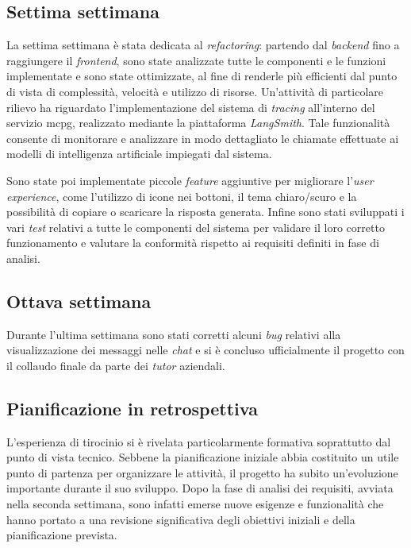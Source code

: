 \subsection{Settima settimana}
La settima settimana è stata dedicata al \textit{refactoring}: 
partendo dal \textit{backend} fino a raggiungere il \textit{frontend}, sono state analizzate tutte le componenti e le funzioni implementate e 
sono state ottimizzate, al fine di renderle 
più efficienti dal punto di vista di complessità, velocità e utilizzo di 
risorse.
Un'attività di particolare rilievo ha riguardato l'implementazione del sistema di \textit{tracing} all'interno del servizio \gls{mcpg}, realizzato mediante la piattaforma \textit{LangSmith}. Tale funzionalità consente di monitorare e analizzare in modo dettagliato le chiamate effettuate ai modelli di intelligenza artificiale impiegati dal sistema.


Sono state poi implementate piccole \textit{feature} aggiuntive per 
migliorare l'\textit{user experience}, come l'utilizzo di icone nei 
bottoni, il tema chiaro/scuro e la possibilità di copiare o 
scaricare la risposta generata. 
Infine sono stati sviluppati i vari \textit{test} relativi a tutte le componenti 
del sistema per validare il loro corretto funzionamento e valutare 
la conformità rispetto ai requisiti definiti in fase di analisi.

\subsection{Ottava settimana}
Durante l'ultima settimana sono stati corretti alcuni \textit{bug} 
relativi alla visualizzazione dei messaggi nelle \textit{chat} e
si è concluso ufficialmente il progetto con il collaudo finale 
da parte dei \textit{tutor} aziendali.


\subsection{Pianificazione in retrospettiva}
L'esperienza di tirocinio si è rivelata particolarmente formativa soprattutto dal 
punto di vista tecnico. Sebbene la pianificazione iniziale
abbia costituito un utile punto di partenza per organizzare le attività, il progetto
ha subito un'evoluzione importante durante il suo sviluppo. Dopo la fase di
analisi dei requisiti, avviata nella seconda settimana, sono infatti emerse nuove esigenze e funzionalità che hanno portato a una revisione significativa degli obiettivi iniziali e della pianificazione prevista.

